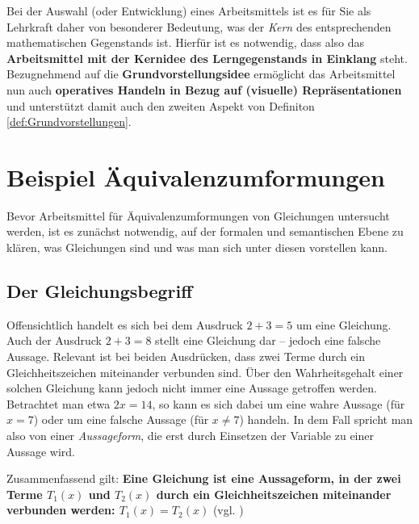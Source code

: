 \documentclass[
]{scrbook}
\theoremstyle{definition}
\theoremstyle{definition}
\theoremstyle{definition}
\theoremstyle{definition}
\theoremstyle{remark}
\begin{document}
Bei der Auswahl (oder Entwicklung) eines Arbeitsmittels ist es für Sie als Lehrkraft daher von besonderer Bedeutung, was der \emph{Kern} des entsprechenden mathematischen Gegenstands ist. Hierfür ist es notwendig, dass also das \textbf{Arbeitsmittel mit der \textcolor{concreteColor}{Kernidee} des Lerngegenstands in Einklang} steht. Bezugnehmend auf die \textbf{\textcolor{semanticColor}{Grundvorstellungsidee}} ermöglicht das Arbeitsmittel nun auch \textbf{operatives Handeln in Bezug auf (visuelle) Repräsentationen} und unterstützt damit auch den zweiten Aspekt von Definiton \ref{def:Grundvorstellungen}.

\section{Beispiel Äquivalenzumformungen}\label{beispiel-uxe4quivalenzumformungen}

Bevor Arbeitsmittel für Äquivalenzumformungen von Gleichungen untersucht werden, ist es zunächst notwendig, auf der \textcolor{formalColor}{formalen} und \textcolor{semanticColor}{semantischen} Ebene zu klären, was Gleichungen sind und was man sich unter diesen vorstellen kann.

\subsection{Der Gleichungsbegriff}\label{der-gleichungsbegriff}

Offensichtlich handelt es sich bei dem Ausdruck \(2+ 3 = 5\) um eine Gleichung. Auch der Ausdruck \(2 + 3 = 8\) stellt eine Gleichung dar -- jedoch eine falsche Aussage. Relevant ist bei beiden Ausdrücken, dass zwei Terme durch ein Gleichheitszeichen miteinander verbunden sind. Über den Wahrheitsgehalt einer solchen Gleichung kann jedoch nicht immer eine Aussage getroffen werden. Betrachtet man etwa \(2x = 14\), so kann es sich dabei um eine wahre Aussage (für \(x=7\)) oder um eine falsche Aussage (für \(x\neq 7\)) handeln. In dem Fall spricht man also von einer \emph{Aussageform}, die erst durch Einsetzen der Variable zu einer Aussage wird.

Zusammenfassend gilt: \textbf{Eine Gleichung ist eine Aussageform, in der zwei Terme \(T_1(x)\) und \(T_2(x)\) durch ein Gleichheitszeichen miteinander verbunden werden: \(T_1(x) = T_2(x)\)} (vgl. )
\end{document}

